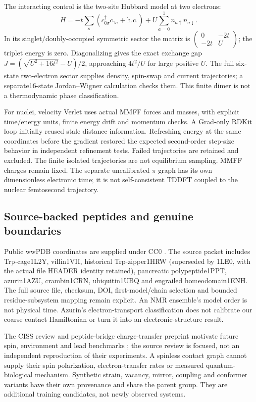 \documentclass[11pt]{article}
\theoremstyle{definition}\newtheorem{definition}[theorem]{Definition}
\theoremstyle{remark}\newtheorem{remark}[theorem]{Remark}
\begin{document}
The interacting control is the two-site Hubbard model at two electrons:
\[
 H=-t\sum_\sigma(c_{0\sigma}^\dagger c_{1\sigma}+\mathrm{h.c.})
   +U\sum_{a=0}^1n_{a\uparrow}n_{a\downarrow}.
\]
In its singlet/doubly-occupied symmetric sector the matrix is
$\left(\begin{smallmatrix}0&-2t\\-2t&U\end{smallmatrix}\right)$;
the triplet energy is zero. Diagonalizing gives the exact exchange gap
$J=(\sqrt{U^2+16t^2}-U)/2$, approaching $4t^2/U$ for large positive $U$.
The full six-state two-electron sector supplies density, spin-swap and current
trajectories; a separate16-state Jordan--Wigner calculation checks them.
This finite dimer is not a thermodynamic phase classification.

For nuclei, velocity Verlet uses actual MMFF forces and masses, with explicit
time/energy units, finite energy drift and momentum checks. A Grad-only RDKit
loop initially reused stale distance information. Refreshing energy at the same
coordinates before the gradient restored the expected second-order step-size
behavior in independent refinement tests. Failed trajectories are retained and
excluded. The finite isolated trajectories are not equilibrium sampling.
MMFF charges remain fixed. The separate uncalibrated $\pi$ graph has its own
dimensionless electronic time; it is not self-consistent TDDFT coupled to the
nuclear femtosecond trajectory.

\subsection{Source-backed peptides and genuine boundaries}
Public wwPDB coordinates are supplied under CC0 \cite{DSPDB}. The source packet
includes Trp-cage1L2Y, villin1VII, historical Trp-zipper1HRW (superseded by
1LE0, with the actual file HEADER identity retained), pancreatic polypeptide1PPT,
azurin1AZU, crambin1CRN, ubiquitin1UBQ and engrailed homeodomain1ENH.
The full source file, checksum, DOI, first-model/chain selection and bounded
residue-subsystem mapping remain explicit. An NMR ensemble's model order is
not physical time. Azurin's electron-transport classification does not calibrate
our coarse contact Hamiltonian or turn it into an electronic-structure result.

The CISS review and peptide-bridge charge-transfer preprint motivate future
spin, environment and lead benchmarks \cite{DSCISS,DSBridge}; the source review is
focused, not an independent reproduction of their experiments. A spinless
contact graph cannot supply their spin polarization, electron-transfer rates
or measured quantum-biological mechanism. Synthetic strain, vacancy, mirror,
coupling and conformer variants have their own provenance and share the parent
group. They are additional training candidates, not newly observed systems.
\end{document}
